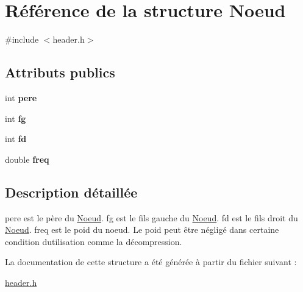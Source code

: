 \hypertarget{structNoeud}{}\section{Référence de la structure Noeud}
\label{structNoeud}


{\ttfamily \#include $<$header.\+h$>$}

\subsection*{Attributs publics}
\begin{DoxyCompactItemize}
\item 
\mbox{\label{structNoeud_a2ea9146a5bd3678a27f8a56c9306de22}} 
int {\bfseries pere}
\item 
\mbox{\label{structNoeud_a2aeffae918ba8274b8b5f75706bb84de}} 
int {\bfseries fg}
\item 
\mbox{\label{structNoeud_a67400f9553fd71df5a67cf32dc2ab639}} 
int {\bfseries fd}
\item 
\mbox{\label{structNoeud_a2678aa0eb590d87e8b61d071c2d5b995}} 
double {\bfseries freq}
\end{DoxyCompactItemize}


\subsection{Description détaillée}
pere est le père du \hyperlink{structNoeud}{Noeud}. fg est le fils gauche du \hyperlink{structNoeud}{Noeud}. fd est le fils droit du \hyperlink{structNoeud}{Noeud}. freq est le poid du noeud. Le poid peut être négligé dans certaine condition d\textquotesingle{}utilisation comme la décompression. 

La documentation de cette structure a été générée à partir du fichier suivant \+:\begin{DoxyCompactItemize}
\item 
\hyperlink{header_8h}{header.\+h}\end{DoxyCompactItemize}
